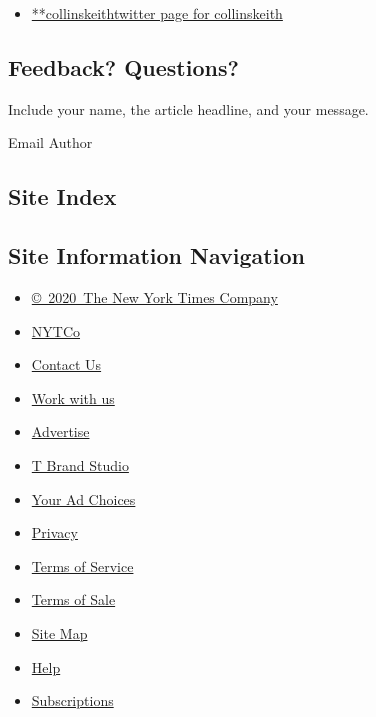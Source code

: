 \begin{itemize}
\tightlist
\item
  \href{https://twitter.com/collinskeith}{**collinskeithtwitter page for
  collinskeith}
\end{itemize}

\hypertarget{feedback-questions}{%
\subsection{Feedback? Questions?}\label{feedback-questions}}

Include your name, the article headline, and your message.

Email Author

\hypertarget{site-index}{%
\subsection{Site Index}\label{site-index}}

\hypertarget{site-information-navigation}{%
\subsection{Site Information
Navigation}\label{site-information-navigation}}

\begin{itemize}
\tightlist
\item
  \href{https://help.nytimes.com/hc/en-us/articles/115014792127-Copyright-notice}{©~2020~The
  New York Times Company}
\end{itemize}

\begin{itemize}
\tightlist
\item
  \href{https://www.nytco.com/}{NYTCo}
\item
  \href{https://help.nytimes.com/hc/en-us/articles/115015385887-Contact-Us}{Contact
  Us}
\item
  \href{https://www.nytco.com/careers/}{Work with us}
\item
  \href{https://nytmediakit.com/}{Advertise}
\item
  \href{http://www.tbrandstudio.com/}{T Brand Studio}
\item
  \href{https://www.nytimes.com/privacy/cookie-policy\#how-do-i-manage-trackers}{Your
  Ad Choices}
\item
  \href{https://www.nytimes.com/privacy}{Privacy}
\item
  \href{https://help.nytimes.com/hc/en-us/articles/115014893428-Terms-of-service}{Terms
  of Service}
\item
  \href{https://help.nytimes.com/hc/en-us/articles/115014893968-Terms-of-sale}{Terms
  of Sale}
\item
  \href{https://spiderbites.nytimes.com}{Site Map}
\item
  \href{https://help.nytimes.com/hc/en-us}{Help}
\item
  \href{https://www.nytimes.com/subscription?campaignId=37WXW}{Subscriptions}
\end{itemize}
